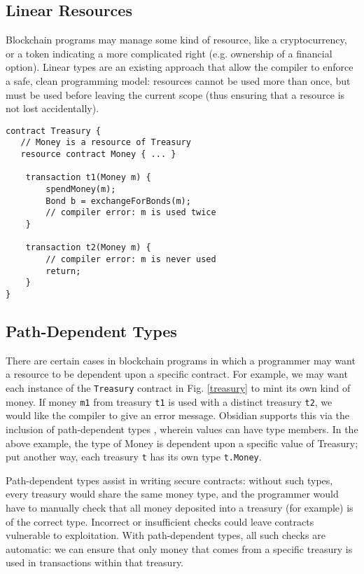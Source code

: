 \documentclass[sigplan,10pt,review]{acmart}\settopmatter{printfolios=true}
\begin{document}
\subsection{Linear Resources}

Blockchain programs may manage some kind of resource, like a cryptocurrency, or a token 
indicating a more complicated right (e.g. ownership of a financial option). Linear types \cite{Wadler} are an existing approach that allow the compiler to
enforce a safe, clean programming model: resources cannot be used more than once, but must be 
used before leaving the current scope (thus ensuring that a resource is not lost accidentally). 

\begin{lstlisting}[caption={Linear resources in Obsidian}, captionpos = b, label = treasury]
contract Treasury {
   // Money is a resource of Treasury
   resource contract Money { ... }

    transaction t1(Money m) {
        spendMoney(m);
        Bond b = exchangeForBonds(m);
        // compiler error: m is used twice
    }

    transaction t2(Money m) {
        // compiler error: m is never used
        return;
    }
}
\end{lstlisting}

\subsection{Path-Dependent Types}

There are certain cases in blockchain programs in which a programmer may want a resource to
be dependent upon a specific contract. For example, we may want each instance of the 
\texttt{\small{Treasury}} contract in Fig. \ref{treasury} to mint its own kind of money. If money \texttt{\small{m1}} from treasury \texttt{\small{t1}} is used with a distinct treasury \texttt{\small{t2}}, we would like the compiler to give an error message. Obsidian supports this via the inclusion of path-dependent types \cite{Amin}, wherein values can have type members. In the 
above example, the type of Money is dependent upon a specific value of Treasury; put another way, 
each treasury \texttt{\small{t}} has its own type \texttt{\small{t.Money}}. 

Path-dependent types assist in writing secure contracts: without such types, every
treasury would share the same money type, and the programmer would have to manually check 
that all money deposited into a treasury (for example) is of the correct type. Incorrect or insufficient 
checks could leave contracts vulnerable to exploitation. With path-dependent types, all such checks 
are automatic: we can ensure that only money that comes from a specific treasury is used in 
transactions within that treasury. 
\end{document}
